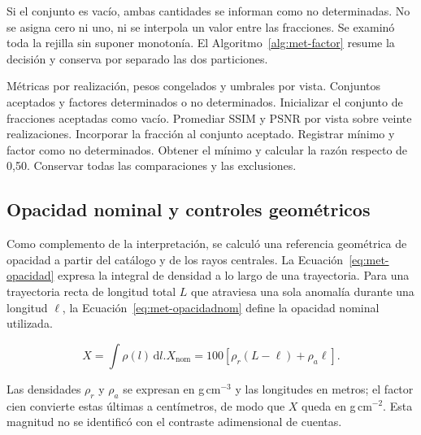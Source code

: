 Si el conjunto es vacío, ambas cantidades se informan como no determinadas. No se asigna cero ni uno, ni se interpola un valor entre las fracciones. Se examinó toda la rejilla sin suponer monotonía. El Algoritmo~\ref{alg:met-factor} resume la decisión y conserva por separado las dos particiones.
\begin{algorithm}[htbp]\small
\caption{Evaluación de la fracción mínima en la rejilla disponible.}\label{alg:met-factor}
\begin{algorithmic}[1]
\Require Métricas por realización, pesos congelados y umbrales por vista.
\Ensure Conjuntos aceptados y factores determinados o no determinados.
\State Inicializar el conjunto de fracciones aceptadas como vacío.
\State Promediar SSIM y PSNR por vista sobre veinte realizaciones.
\State Incorporar la fracción al conjunto aceptado.
\EndIf
\EndFor
{}
\State Registrar mínimo y factor como no determinados.
\Else
\State Obtener el mínimo y calcular la razón respecto de 0,50.
\EndIf
\State Conservar todas las comparaciones y las exclusiones.
\EndFor
\end{algorithmic}\end{algorithm}

\subsection{Opacidad nominal y controles geométricos}\label{sec:met-opacidad}
Como complemento de la interpretación, se calculó una referencia geométrica de opacidad a partir del catálogo y de los rayos centrales. La Ecuación~\eqref{eq:met-opacidad} expresa la integral de densidad a lo largo de una trayectoria. Para una trayectoria recta de longitud total $L$ que atraviesa una sola anomalía durante una longitud $\ell$, la Ecuación~\eqref{eq:met-opacidadnom} define la opacidad nominal utilizada.
\begin{samepage}\begin{subequations}
\begin{equation}X=\int\rho(l)\,\mathrm dl.\label{eq:met-opacidad}\end{equation}
\begin{equation}X_{\mathrm{nom}}=100\left[\rho_r(L-\ell)+\rho_a\ell\right].\label{eq:met-opacidadnom}\end{equation}
\end{subequations}\end{samepage}
Las densidades $\rho_r$ y $\rho_a$ se expresan en g\,cm$^{-3}$ y las longitudes en metros; el factor cien convierte estas últimas a centímetros, de modo que $X$ queda en g\,cm$^{-2}$. Esta magnitud no se identificó con el contraste adimensional de cuentas.

